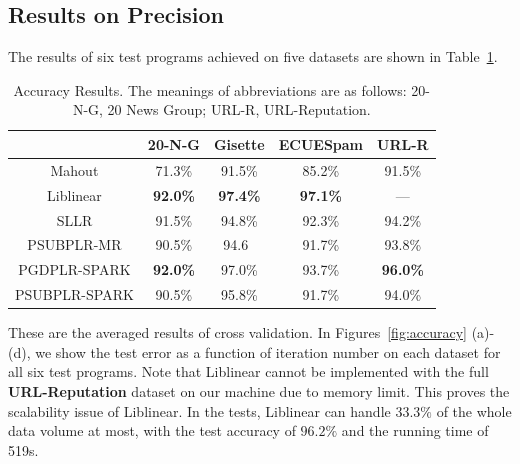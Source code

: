 \documentclass[10pt, conference, compsocconf]{IEEEtran}
\begin{document}
\subsection{Results on Precision} \label{sec:precision}
The results of six test programs achieved on five datasets are shown in Table~\ref{tab:table3}.
%
\begin{table}[h]
\centering
\caption{Accuracy Results. The meanings of abbreviations are as follows: 20-N-G, 20 News Group; URL-R, URL-Reputation.}\label{tab:table3}\vspace{-0.3cm}
\begin{tabular}{|c|c|c|c|c|}
\hline
           & 20-N-G & Gisette & ECUESpam & URL-R \\
\hline
Mahout     & 71.3\% & 91.5\% & 85.2\% & 91.5\% \\
\hline
Liblinear  & \textbf{92.0\%} & \textbf{97.4\%} & \textbf{97.1\%} & --- \\
\hline
SLLR       & 91.5\% & 94.8\% & 92.3\% & 94.2\% \\
\hline
PSUBPLR-MR & 90.5\% & 94.6\ & 91.7\% & 93.8\% \\
\hline
PGDPLR-SPARK & \textbf{92.0\%} & 97.0\% & 93.7\% & \textbf{96.0\%} \\
\hline
PSUBPLR-SPARK & 90.5\% & 95.8\% & 91.7\% & 94.0\% \\
\hline
\end{tabular}
\end{table}
%
These are the averaged results of cross validation.
In Figures~\ref{fig:accuracy} (a)-(d), we show the test error as a function of iteration number on each dataset for all six test programs.
Note that Liblinear cannot be implemented with the full \textbf{URL-Reputation} dataset on our machine due to memory limit.
This proves the scalability issue of Liblinear.
In the tests, Liblinear can handle $33.3\%$ of the whole data volume at most, with the test accuracy of $96.2\%$ and the running time of 519s.
%
\end{document}
